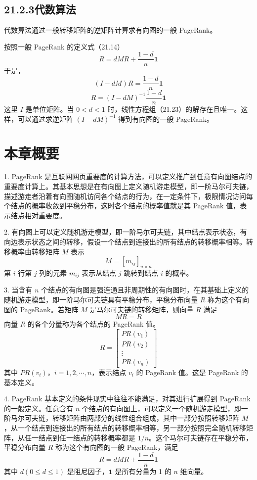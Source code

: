 \documentclass[UTF8,12pt,a4paper,fontset=fandol]{ctexart}
\begin{document}
\subsection*{21.2.3\quad 代数算法}

代数算法通过一般转移矩阵的逆矩阵计算求有向图的一般 PageRank。

按照一般 PageRank 的定义式（21.14）
\[
R=dMR+\frac{1-d}{n}\mathbf{1}
\]
于是，
\begin{equation}
(I-dM)R=\frac{1-d}{n}\mathbf{1}
\tag{21.23}
\end{equation}
\begin{equation}
R=(I-dM)^{-1}\frac{1-d}{n}\mathbf{1}
\tag{21.24}
\end{equation}
这里 $I$ 是单位矩阵。当 $0<d<1$ 时，线性方程组（21.23）的解存在且唯一。这样，可以通过求逆矩阵 $(I-dM)^{-1}$ 得到有向图的一般 PageRank。

\section*{本章概要}

1. PageRank 是互联网网页重要度的计算方法，可以定义推广到任意有向图结点的重要度计算上。其基本思想是在有向图上定义随机游走模型，即一阶马尔可夫链，描述游走者沿着有向图随机访问各个结点的行为，在一定条件下，极限情况访问每个结点的概率收敛到平稳分布，这时各个结点的概率值就是其 PageRank 值，表示结点相对重要度。

2. 有向图上可以定义随机游走模型，即一阶马尔可夫链，其中结点表示状态，有向边表示状态之间的转移，假设一个结点到连接出的所有结点的转移概率相等。转移概率由转移矩阵 $M$ 表示
\[
M=[m_{ij}]_{n\times n}
\]
第 $i$ 行第 $j$ 列的元素 $m_{ij}$ 表示从结点 $j$ 跳转到结点 $i$ 的概率。

3. 当含有 $n$ 个结点的有向图是强连通且非周期性的有向图时，在其基础上定义的随机游走模型，即一阶马尔可夫链具有平稳分布，平稳分布向量 $R$ 称为这个有向图的 PageRank。若矩阵 $M$ 是马尔可夫链的转移矩阵，则向量 $R$ 满足
\[
MR=R
\]
向量 $R$ 的各个分量称为各个结点的 PageRank 值。
\[
R=
\begin{bmatrix}
PR(v_1)\\
PR(v_2)\\
\vdots\\
PR(v_n)
\end{bmatrix}
\]
其中 $PR(v_i)$，$i=1,2,\cdots,n$，表示结点 $v_i$ 的 PageRank 值。这是 PageRank 的基本定义。

4. PageRank 基本定义的条件现实中往往不能满足，对其进行扩展得到 PageRank 的一般定义。任意含有 $n$ 个结点的有向图上，可以定义一个随机游走模型，即一阶马尔可夫链，转移矩阵由两部分的线性组合组成，其中一部分按照转移矩阵 $M$，从一个结点到连接出的所有结点的转移概率相等，另一部分按照完全随机转移矩阵，从任一结点到任一结点的转移概率都是 $1/n$。这个马尔可夫链存在平稳分布，平稳分布向量 $R$ 称为这个有向图的一般 PageRank，满足
\[
R=dMR+\frac{1-d}{n}\mathbf{1}
\]
其中 $d(0\leqslant d\leqslant 1)$ 是阻尼因子，$\mathbf{1}$ 是所有分量为 1 的 $n$ 维向量。
\end{document}

